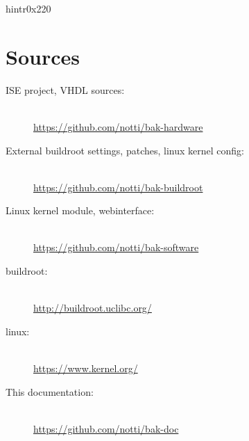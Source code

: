 \documentclass[11pt,technote,a4paper,onecolumn,dvips]{IEEEtran}
\begin{document}
\begin{register}{h}{intr}{0x220}%
    \label{intr}%
    \regnewline%
\end{register}

\clearpage
\section{Sources}
\begin{description}
    \item[ISE project, VHDL sources:] \hfill \\
        \url{https://github.com/notti/bak-hardware}
    \item[External buildroot settings, patches, linux kernel config:] \hfill \\
        \url{https://github.com/notti/bak-buildroot}
    \item[Linux kernel module, webinterface:] \hfill \\
        \url{https://github.com/notti/bak-software}
    \item[buildroot:] \hfill \\
        \url{http://buildroot.uclibc.org/}
    \item[linux:] \hfill \\
        \url{https://www.kernel.org/}
    \item[This documentation:] \hfill \\
        \url{https://github.com/notti/bak-doc}
\end{description}


\begingroup
\raggedright
\sloppy

\endgroup
\end{document}
